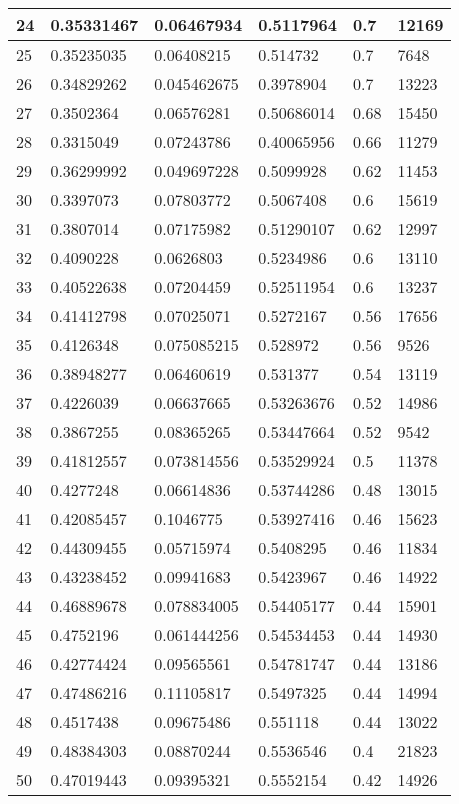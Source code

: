 \begin{longtable}{|l|l|l|l|l|l|}
24 & 0.35331467 & 0.06467934 & 0.5117964 & 0.7 & 12169 \\ \hline 
25 & 0.35235035 & 0.06408215 & 0.514732 & 0.7 & 7648 \\ \hline 
26 & 0.34829262 & 0.045462675 & 0.3978904 & 0.7 & 13223 \\ \hline 
27 & 0.3502364 & 0.06576281 & 0.50686014 & 0.68 & 15450 \\ \hline 
28 & 0.3315049 & 0.07243786 & 0.40065956 & 0.66 & 11279 \\ \hline 
29 & 0.36299992 & 0.049697228 & 0.5099928 & 0.62 & 11453 \\ \hline 
30 & 0.3397073 & 0.07803772 & 0.5067408 & 0.6 & 15619 \\ \hline 
31 & 0.3807014 & 0.07175982 & 0.51290107 & 0.62 & 12997 \\ \hline 
32 & 0.4090228 & 0.0626803 & 0.5234986 & 0.6 & 13110 \\ \hline 
33 & 0.40522638 & 0.07204459 & 0.52511954 & 0.6 & 13237 \\ \hline 
34 & 0.41412798 & 0.07025071 & 0.5272167 & 0.56 & 17656 \\ \hline 
35 & 0.4126348 & 0.075085215 & 0.528972 & 0.56 & 9526 \\ \hline 
36 & 0.38948277 & 0.06460619 & 0.531377 & 0.54 & 13119 \\ \hline 
37 & 0.4226039 & 0.06637665 & 0.53263676 & 0.52 & 14986 \\ \hline 
38 & 0.3867255 & 0.08365265 & 0.53447664 & 0.52 & 9542 \\ \hline 
39 & 0.41812557 & 0.073814556 & 0.53529924 & 0.5 & 11378 \\ \hline 
40 & 0.4277248 & 0.06614836 & 0.53744286 & 0.48 & 13015 \\ \hline 
41 & 0.42085457 & 0.1046775 & 0.53927416 & 0.46 & 15623 \\ \hline 
42 & 0.44309455 & 0.05715974 & 0.5408295 & 0.46 & 11834 \\ \hline 
43 & 0.43238452 & 0.09941683 & 0.5423967 & 0.46 & 14922 \\ \hline 
44 & 0.46889678 & 0.078834005 & 0.54405177 & 0.44 & 15901 \\ \hline 
45 & 0.4752196 & 0.061444256 & 0.54534453 & 0.44 & 14930 \\ \hline 
46 & 0.42774424 & 0.09565561 & 0.54781747 & 0.44 & 13186 \\ \hline 
47 & 0.47486216 & 0.11105817 & 0.5497325 & 0.44 & 14994 \\ \hline 
48 & 0.4517438 & 0.09675486 & 0.551118 & 0.44 & 13022 \\ \hline 
49 & 0.48384303 & 0.08870244 & 0.5536546 & 0.4 & 21823 \\ \hline 
50 & 0.47019443 & 0.09395321 & 0.5552154 & 0.42 & 14926 \\ \hline 
\end{longtable}